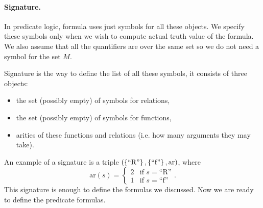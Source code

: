 \paragraph{Signature.}
In predicate logic, formula uses just symbols for all these objects. We specify
these symbols only when we wish to compute actual truth value of the formula.
We also assume that all the quantifiers are over the same set so we do not need
a symbol for the set $M$.

Signature is the way to define the list of all these symbols, it consists of
three objects:
\begin{itemize}
  \item the set (possibly empty) of symbols for relations,
  \item the set (possibly empty) of symbols for functions,
  \item arities of these functions and relations (i.e. how many arguments they
    may take).
\end{itemize}
An example of a signature is a triple $(\set{\text{``R''}}, \set{\text{``f''}},
\mathrm{ar})$, where
\[
  \mathrm{ar}(s) = \begin{cases}
    2 & \text{if } s =  \text{``R''} \\
    1 & \text{if } s =  \text{``f''}
  \end{cases}.
\]
This signature is enough to define the formulas we discussed. Now we are ready
to define the predicate formulas.


